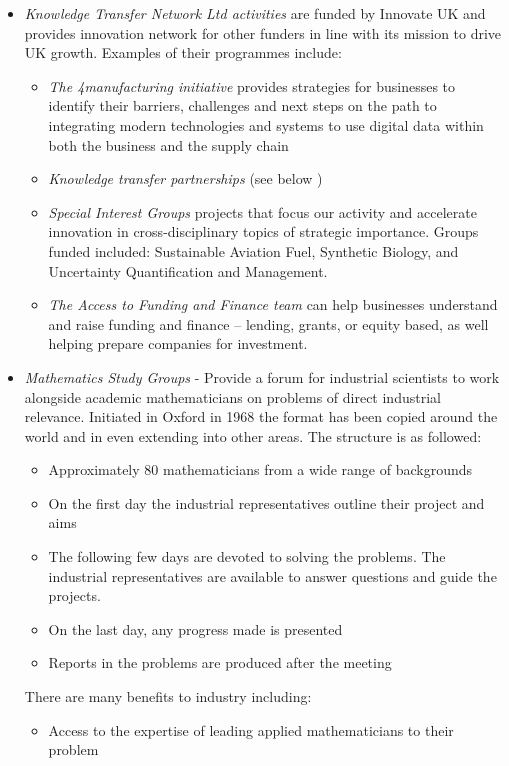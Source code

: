 \documentclass[11pt]{article} %
\begin{document}
\begin{itemize}
		\item \textit{Knowledge Transfer Network Ltd activities } are funded by Innovate UK  and provides innovation network for other funders in line with its mission to drive UK growth. Examples of their programmes include: 
		\begin{itemize}
			\item \textit{ The 4manufacturing initiative } provides strategies for businesses to identify their barriers, challenges and next steps on the path to integrating modern technologies and systems to use digital data within both the business and the supply chain
			\item \textit{Knowledge transfer partnerships} (see below )
			\item \textit{Special Interest Groups} projects that focus our activity and accelerate innovation in cross-disciplinary topics of strategic importance. Groups funded included: Sustainable Aviation Fuel, Synthetic Biology, and Uncertainty Quantification and Management.
			\item \textit{The Access to Funding and Finance team} can help businesses understand and raise funding and finance – lending, grants, or equity based, as well helping prepare companies for investment.
		\end{itemize}
		\item \textit{Mathematics Study Groups} - Provide a forum for industrial scientists to work alongside academic mathematicians  on problems of direct industrial relevance. Initiated in Oxford in 1968 the format has been copied around the world and in even extending into other areas. The structure is as followed: 
		\begin{itemize}
			\item Approximately 80 mathematicians from a wide range of backgrounds
			\item On the first day the industrial representatives outline their project and aims
			\item The following few days are devoted to solving the problems. The industrial representatives are available to answer questions and guide the projects.
			\item On the last day, any progress made is presented
			\item Reports in the problems are produced after the meeting  
		\end{itemize}
		There are many benefits to industry including: 
		\begin{itemize}
			\item Access to the expertise of leading applied mathematicians to their problem

\end{itemize}
\end{itemize}
\end{document}
